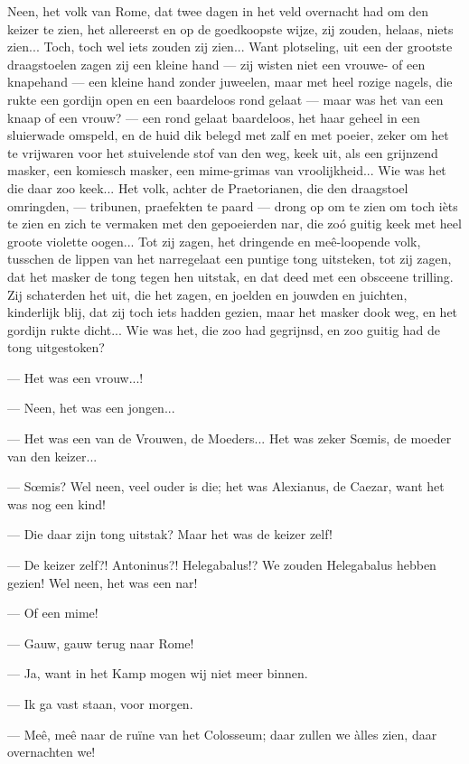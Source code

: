 \documentclass[a4paper, 12pt, oneside, dutch]{article}
\begin{document}
Neen, het volk van Rome, dat twee dagen in het veld overnacht had om den keizer te zien, het allereerst en op de goedkoopste wijze, zij zouden, helaas, niets zien... Toch, toch wel iets zouden zij zien... Want plotseling, uit een der grootste draagstoelen zagen zij een kleine hand --- zij wisten niet een vrouwe- of een knapehand --- een kleine hand zonder juweelen, maar met heel rozige nagels, die rukte een gordijn open en een baardeloos rond gelaat --- maar was het van een knaap of een vrouw? --- een rond gelaat baardeloos, het haar geheel in een sluierwade omspeld, en de huid dik belegd met zalf en met poeier, zeker om het te vrijwaren voor het stuivelende stof van den weg, keek uit, als een grijnzend masker, een komiesch masker, een mime-grimas van vroolijkheid... Wie was het die daar zoo keek... Het volk, achter de Praetorianen, die den draagstoel omringden, --- tribunen, praefekten te paard --- drong op om te zien om toch ièts te zien en zich te vermaken met den gepoeierden nar, die zoó guitig keek met heel groote violette oogen... Tot zij zagen, het dringende en meê-loopende volk, tusschen de lippen van het narregelaat een puntige tong uitsteken, tot zij zagen, dat het masker de tong tegen hen uitstak, en dat deed met een obsceene trilling. Zij schaterden het uit, die het zagen, en joelden en jouwden en juichten, kinderlijk blij, dat zij toch iets hadden gezien, maar het masker dook weg, en het gordijn rukte dicht... Wie was het, die zoo had gegrijnsd, en zoo guitig had de tong uitgestoken?

--- Het was een vrouw...!

--- Neen, het was een jongen...

--- Het was een van de Vrouwen, de Moeders... Het was zeker Sœmis, de moeder van den keizer...

--- Sœmis? Wel neen, veel ouder is die; het was Alexianus, de Caezar, want het was nog een kind!

--- Die daar zijn tong uitstak? Maar het was de keizer zelf!

--- De keizer zelf?! Antoninus?! Helegabalus!? We zouden Helegabalus hebben gezien! Wel neen, het was een nar!

--- Of een mime!

--- Gauw, gauw terug naar Rome!

--- Ja, want in het Kamp mogen wij niet meer binnen.

--- Ik ga vast staan, voor morgen.

--- Meê, meê naar de ruïne van het Colosseum; daar zullen we àlles zien, daar overnachten we!
\end{document}
